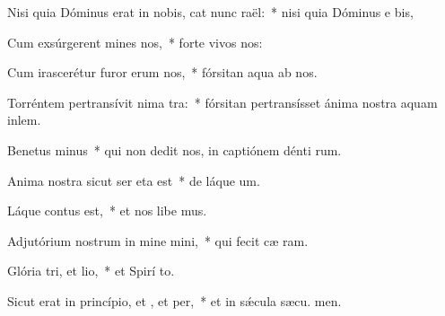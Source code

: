 \item Nisi quia Dóminus erat in nobis, cat nunc raël:~* nisi quia Dóminus e  bis,
\item Cum exsúrgerent mines  nos,~* forte vivos  nos:
\item Cum irascerétur furor erum  nos,~* fórsitan aqua ab nos.
\item Torréntem pertransívit nima tra:~* fórsitan pertransísset ánima nostra aquam inlem.
\item Benetus minus~* qui non dedit nos, in captiónem dénti rum.
\item Anima nostra sicut ser eta est~* de láque um.
\item Láque contus est,~* et nos libe mus.
\item Adjutórium nostrum in mine mini,~* qui fecit cæ  ram.
\item Glória tri, et lio,~* et Spirí to.
\item Sicut erat in princípio, et , et per,~* et in sǽcula sæcu. men.
